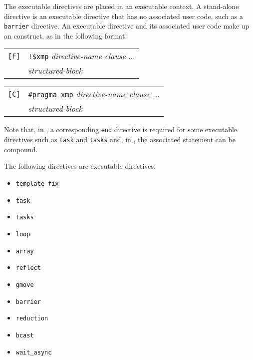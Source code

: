 The executable directives are placed in an executable context. A
stand-alone directive is an executable directive that has no associated
user code, such as a {\tt barrier} directive.
%
An executable directive and its associated user code make up an
{\XMP} construct, as in the following format:

\vspace{0.5cm}

\begin{tabular}{ll}
\verb![F]! & \verb|!$xmp| {\it directive-name clause} ...\\
 & \hspace{0.5cm} {\it structured-block} \\
\end{tabular}

\vspace{0.3cm}

\begin{tabular}{ll}
\verb![C]! & \verb|#pragma xmp| {\it directive-name clause} ...\\
 & \hspace{0.5cm} {\it structured-block} \\
\end{tabular}

\vspace{0.5cm}

Note that, in {\XMPF}, a corresponding {\tt end} directive is required
for some executable directives such as {\tt task} and {\tt tasks} and,
in {\XMPC}, the associated statement can be compound.

%

The following directives are executable directives.

\begin{itemize}
 \item {\tt template\_fix}
 \item {\tt task}
 \item {\tt tasks}
 \item {\tt loop}
 \item {\tt array}
 \item {\tt reflect}
 \item {\tt gmove}
 \item {\tt barrier}
 \item {\tt reduction}
 \item {\tt bcast}
 \item {\tt wait\_async}
\end{itemize}


